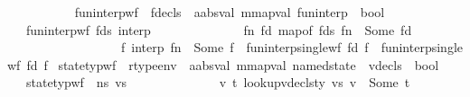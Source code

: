 \begin{isabellebody}
\ \ \ \ \ \ \ \ \ \isanewline
\isanewline
{}\isamarkupfalse%
\ fun{\isacharunderscore}{\kern0pt}interp{\isacharunderscore}{\kern0pt}wf\ {\isacharcolon}{\kern0pt}{\isacharcolon}{\kern0pt}\ {\isachardoublequoteopen}fdecls\ {\isasymRightarrow}\ {\isacharparenleft}{\kern0pt}{\isacharprime}{\kern0pt}a{\isacharcolon}{\kern0pt}{\isacharcolon}{\kern0pt}absval{\isacharcomma}{\kern0pt}\ {\isacharprime}{\kern0pt}m{\isacharcolon}{\kern0pt}{\isacharcolon}{\kern0pt}mapval{\isacharparenright}{\kern0pt}\ fun{\isacharunderscore}{\kern0pt}interp\ {\isasymRightarrow}\ bool{\isachardoublequoteclose}\isanewline
\ \ \ {\isachardoublequoteopen}fun{\isacharunderscore}{\kern0pt}interp{\isacharunderscore}{\kern0pt}wf\ fds\ {\isasymgamma}{\isacharunderscore}{\kern0pt}interp\ {\isacharequal}{\kern0pt}\ \isanewline
\ \ \ \ \ \ \ \ \ \ \ \ {\isacharparenleft}{\kern0pt}{\isasymforall}fn\ fd{\isachardot}{\kern0pt}\ map{\isacharunderscore}{\kern0pt}of\ fds\ fn\ {\isacharequal}{\kern0pt}\ Some\ fd\ {\isasymlongrightarrow}\ \isanewline
\ \ \ \ \ \ \ \ \ \ \ \ \ \ \ \ \ \ {\isacharparenleft}{\kern0pt}{\isasymexists}f{\isachardot}{\kern0pt}\ {\isasymgamma}{\isacharunderscore}{\kern0pt}interp\ fn\ {\isacharequal}{\kern0pt}\ Some\ f\ {\isasymand}\ fun{\isacharunderscore}{\kern0pt}interp{\isacharunderscore}{\kern0pt}single{\isacharunderscore}{\kern0pt}wf\ fd\ f\ {\isasymand}\ fun{\isacharunderscore}{\kern0pt}interp{\isacharunderscore}{\kern0pt}single{\isacharunderscore}{\kern0pt}wf{\isacharunderscore}{\kern0pt}{}\ fd\ f{\isacharparenright}{\kern0pt}{\isacharparenright}{\kern0pt}{\isachardoublequoteclose}\isanewline
\isanewline
{}\isamarkupfalse%
\ state{\isacharunderscore}{\kern0pt}typ{\isacharunderscore}{\kern0pt}wf\ {\isacharcolon}{\kern0pt}{\isacharcolon}{\kern0pt}\ {\isachardoublequoteopen}rtype{\isacharunderscore}{\kern0pt}env\ {\isasymRightarrow}\ {\isacharparenleft}{\kern0pt}{\isacharprime}{\kern0pt}a{\isacharcolon}{\kern0pt}{\isacharcolon}{\kern0pt}absval{\isacharcomma}{\kern0pt}\ {\isacharprime}{\kern0pt}m{\isacharcolon}{\kern0pt}{\isacharcolon}{\kern0pt}mapval{\isacharparenright}{\kern0pt}\ named{\isacharunderscore}{\kern0pt}state\ {\isasymRightarrow}\ vdecls\ {\isasymRightarrow}\ bool{\isachardoublequoteclose}\isanewline
\ \ \ {\isachardoublequoteopen}state{\isacharunderscore}{\kern0pt}typ{\isacharunderscore}{\kern0pt}wf\ {\isasymOmega}\ ns\ vs\ {\isacharequal}{\kern0pt}\ \isanewline
\ \ \ \ \ \ \ \ \ \ \ {\isacharparenleft}{\kern0pt}{\isasymforall}\ v\ t{\isachardot}{\kern0pt}\ lookup{\isacharunderscore}{\kern0pt}vdecls{\isacharunderscore}{\kern0pt}ty\ vs\ v\ {\isacharequal}{\kern0pt}\ Some\ t\ \ {\isasymlongrightarrow}\ \isanewline

\end{isabellebody}
